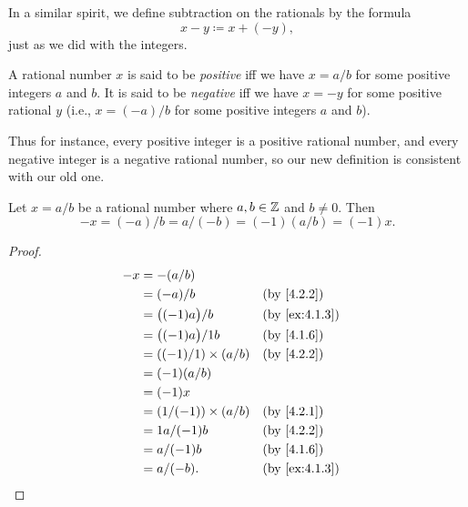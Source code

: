 \begin{note}
  In a similar spirit, we define subtraction on the rationals by the formula
  \[
    x - y \coloneqq x + (-y),
  \]
  just as we did with the integers.
\end{note}

\begin{defn}\label{4.2.6}
  A rational number \(x\) is said to be \emph{positive} iff we have \(x = a / b\) for some positive integers \(a\) and \(b\).
  It is said to be \emph{negative} iff we have \(x = -y\) for some positive rational \(y\)
  (i.e., \(x = (-a) / b\) for some positive integers \(a\) and \(b\)).
\end{defn}

\begin{note}
  Thus for instance, every positive integer is a positive rational number, and every negative integer is a negative rational number, so our new definition is consistent with our old one.
\end{note}

\begin{ac}\label{ac:4.2.3}
  Let \(x = a / b\) be a rational number where \(a, b \in \mathbb{Z}\) and \(b \neq 0\).
  Then
  \[
    -x = (-a) / b = a / (-b) = (-1)(a / b) = (-1)x.
  \]
\end{ac}

\begin{proof}
  \begin{align*}
    -x & = -(a / b)                                     \\
       & = (-a) / b                  &  & \by{4.2.2}    \\
       & = \big((-1)a\big) / b       &  & \by{ex:4.1.3} \\
       & = \big((-1)a\big) / 1b      &  & \by{4.1.6}    \\
       & = ((-1) / 1) \times (a / b) &  & \by{4.2.2}    \\
       & = (-1)(a / b)                                  \\
       & = (-1)x                                        \\
       & = (1 / (-1)) \times (a / b) &  & \by{4.2.1}    \\
       & = 1a / (-1)b                &  & \by{4.2.2}    \\
       & = a / (-1)b                 &  & \by{4.1.6}    \\
       & = a / (-b).                 &  & \by{ex:4.1.3}
  \end{align*}
\end{proof}

